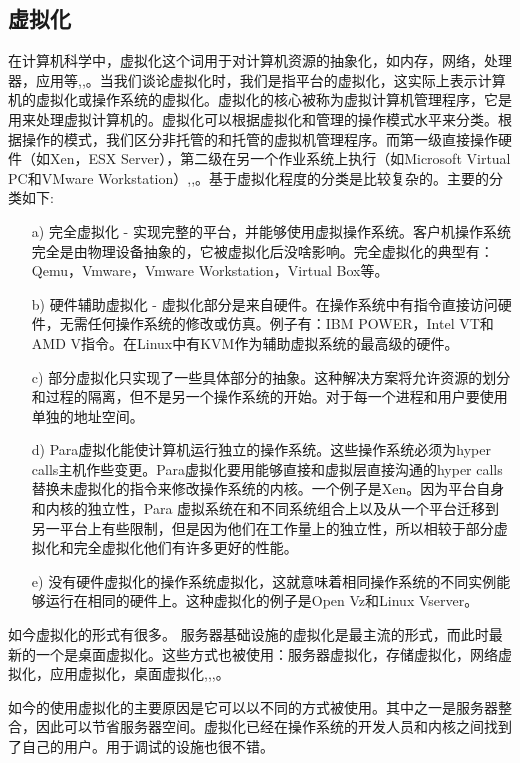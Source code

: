 \documentclass[10pt,a4paper]{article}
\begin{document}
\begin{CJK*}{UTF8}{gkai}
\section{虚拟化}
在计算机科学中，虚拟化这个词用于对计算机资源的抽象化，如内存，网络，处理器，应用等\cite{2},\cite{5},\cite{6}。当我们谈论虚拟化时，我们是指平台的虚拟化，这实际上表示计算机的虚拟化或操作系统的虚拟化\cite{2}。虚拟化的核心被称为虚拟计算机管理程序，它是用来处理虚拟计算机的。虚拟化可以根据虚拟化和管理的操作模式水平来分类。根据操作的模式，我们区分非托管的和托管的虚拟机管理程序。而第一级直接操作硬件（如Xen，ESX Server），第二级在另一个作业系统上执行（如Microsoft Virtual PC和VMware Workstation）\cite{3},\cite{12},\cite{16}。基于虚拟化程度的分类是比较复杂的。主要的分类如下:
\begin{itemize}
\item[a)] 完全虚拟化 - 实现完整的平台，并能够使用虚拟操作系统。客户机操作系统完全是由物理设备抽象的，它被虚拟化后没啥影响。完全虚拟化的典型有：Qemu，Vmware，Vmware Workstation，Virtual Box等。
\item[b)] 硬件辅助虚拟化 - 虚拟化部分是来自硬件。在操作系统中有指令直接访问硬件，无需任何操作系统的修改或仿真。例子有：IBM POWER，Intel VT和 AMD V指令。在Linux中有KVM作为辅助虚拟系统的最高级的硬件。
\item[c)] 部分虚拟化只实现了一些具体部分的抽象。这种解决方案将允许资源的划分和过程的隔离，但不是另一个操作系统的开始。对于每一个进程和用户要使用单独的地址空间。
\item[d)] Para虚拟化能使计算机运行独立的操作系统。这些操作系统必须为hyper calls主机作些变更。Para虚拟化要用能够直接和虚拟层直接沟通的hyper calls替换未虚拟化的指令来修改操作系统的内核。一个例子是Xen。因为平台自身和内核的独立性，Para 虚拟系统在和不同系统组合上以及从一个平台迁移到另一平台上有些限制，但是因为他们在工作量上的独立性，所以相较于部分虚拟化和完全虚拟化他们有许多更好的性能。
\item[e)] 没有硬件虚拟化的操作系统虚拟化，这就意味着相同操作系统的不同实例能够运行在相同的硬件上。这种虚拟化的例子是Open Vz和Linux Vserver。
\end{itemize} 


如今虚拟化的形式有很多。 服务器基础设施的虚拟化是最主流的形式，而此时最新的一个是桌面虚拟化。这些方式也被使用：服务器虚拟化，存储虚拟化，网络虚拟化，应用虚拟化，桌面虚拟化\cite{10},\cite{12},\cite{13},\cite{16}。 


如今的使用虚拟化的主要原因是它可以以不同的方式被使用。其中之一是服务器整合，因此可以节省服务器空间。虚拟化已经在操作系统的开发人员和内核之间找到了自己的用户。用于调试的设施也很不错。



\end{CJK*}
\end{document}
